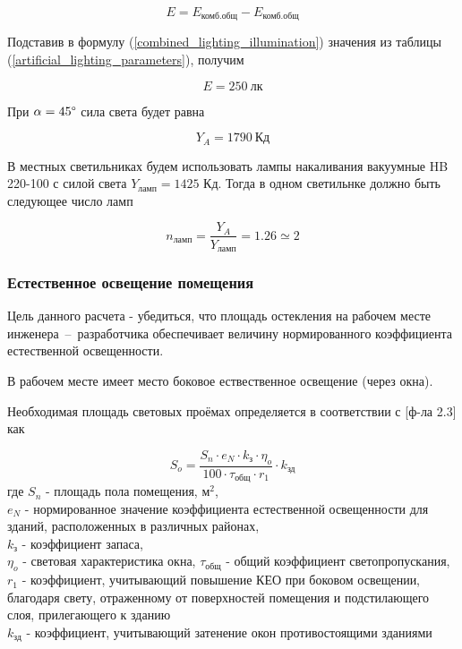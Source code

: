 \begin{equation}
    E = E_\text{комб.общ} - E_\text{комб.общ}
    \label{combined_lighting_illumination}
\end{equation}

Подставив в формулу (\ref{combined_lighting_illumination}) значения из таблицы
(\ref{artificial_lighting_parameters}), получим

$$
    E = 250 ~\text{лк}
$$

При $\alpha = 45 \degree$ сила света будет равна

$$
    Y_A = 1790 ~\text{Кд}
$$

В местных светильниках будем использовать лампы накаливания вакуумные HB 220-100
с силой света $Y_\text{ламп} = 1425$ Кд. Тогда в одном светильнке должно быть следующее число
ламп

$$
    n_\text{ламп} = \frac{Y_A}{Y_\text{ламп}} = 1.26 \simeq 2
$$

\subsubsection{Естественное освещение помещения}

Цель данного расчета - убедиться, что площадь остекления на рабочем месте
инженера~--~разработчика обеспечивает величину нормированного коэффициента
естественной освещенности.

В рабочем месте имеет место боковое ествественное освещение (через окна).

Необходимая площадь световых проёмах определяется в соответствии с
\cite{lighting_calc_method}[ф-ла 2.3] как

\begin{equation}
    S_o = \frac{S_n \cdot e_N \cdot k_\text{з} \cdot \eta_o}{100 \cdot \tau_\text{общ} \cdot r_1}
            \cdot k_\text{зд}
    \label{windows_area}
\end{equation}
где $S_n$ - площадь пола помещения, $\text{м}^2$,                                   \\
$e_N$ - нормированное значение коэффициента естественной освещенности для зданий,
расположенных в различных районах,                                                  \\
$k_\text{з}$ - коэффициент запаса,                                                  \\
$\eta_o$ - световая характеристика окна,
$\tau_\text{общ}$ - общий коэффициент светопропускания,                             \\
$r_1$ - коэффициент, учитывающий повышение КЕО при боковом освещении, благодаря
свету, отраженному от поверхностей помещения и подстилающего слоя, прилегающего
к зданию                                                                            \\
$k_\text{зд}$ - коэффициент, учитывающий затенение окон противостоящими зданиями

